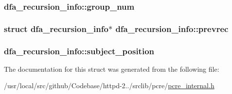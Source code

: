 \subsubsection[{\texorpdfstring{group\+\_\+num}{group_num}}]{ dfa\+\_\+recursion\+\_\+info\+::group\+\_\+num}\hypertarget{structdfa__recursion__info_a8014a7c394cc2a84dea59e56a27e4878}{}\label{structdfa__recursion__info_a8014a7c394cc2a84dea59e56a27e4878}
\subsubsection[{\texorpdfstring{prevrec}{prevrec}}]{\setlength{\rightskip}{0pt plus 5cm}struct {\bf dfa\+\_\+recursion\+\_\+info}$\ast$ dfa\+\_\+recursion\+\_\+info\+::prevrec}\hypertarget{structdfa__recursion__info_afd275b66e5b52edf74a7e7cb1f9ea625}{}\label{structdfa__recursion__info_afd275b66e5b52edf74a7e7cb1f9ea625}
\subsubsection[{\texorpdfstring{subject\+\_\+position}{subject_position}}]{ dfa\+\_\+recursion\+\_\+info\+::subject\+\_\+position}\hypertarget{structdfa__recursion__info_a02acd67944a3cd415532136ba40f0b0b}{}\label{structdfa__recursion__info_a02acd67944a3cd415532136ba40f0b0b}


The documentation for this struct was generated from the following file\+:\begin{DoxyCompactItemize}
\item 
/usr/local/src/github/\+Codebase/httpd-\/2../srclib/pcre/\hyperlink{pcre__internal_8h}{pcre\+\_\+internal.\+h}\end{DoxyCompactItemize}
